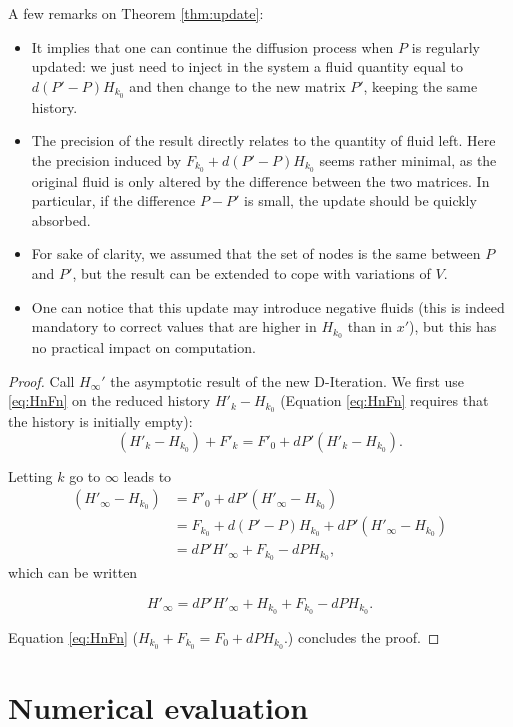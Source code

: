 \documentclass{llncs}
\begin{document}
A few remarks on Theorem \ref{thm:update}:
\begin{itemize}
\item It implies that one can continue the diffusion process when $P$ is regularly updated: we just need to inject in the system a fluid quantity equal to $d(P' - P) H_{k_0}$ and then change to the new matrix $P'$, keeping the same history. \item The precision of the result directly relates to the quantity of fluid left. Here the precision induced by $ F_{k_0}+d(P'-P)H_{k_0} $ seems rather minimal, as the original fluid is only altered by the difference between the two matrices. In particular, if the difference $ P-P' $ is small, the update should be quickly absorbed.
\item For sake of clarity, we assumed that the set of nodes is the same between $ P $ and $ P' $, but the result can be extended to cope with variations of $ V $.
\item One can notice that this update may introduce negative fluids (this is indeed mandatory to correct values that are higher in $ H_{k_0} $ than in $x'$), but this has no practical impact on computation.
\end{itemize}

\begin{proof}
Call $ H_{\infty}' $ the asymptotic result of the new D-Iteration. We first use \eqref{eq:HnFn} on the reduced history $ H'_k-H_{k_0} $ (Equation \eqref{eq:HnFn} requires that the history is initially empty):
$$(H'_k-H_{k_0}) + F'_k = F'_0 + d P' (H'_k-H_{k_0}).$$

Letting $ k $ go to $ \infty $ leads to 
$$
\begin{array}{rl}
(H'_{\infty}-H_{k_0}) &= F'_0 + d P' (H'_{\infty}-H_{k_0})\\
&= F_{k_0}+d(P'-P)H_{k_0}+ d P' (H'_{\infty}-H_{k_0})\\
&=  d P' H'_{\infty} +  F_{k_0} -d P H_{k_0},
\end{array}
$$
which can be written

$$H'_{\infty} =d P' H'_{\infty} +  H_{k_0} + F_{k_0} -d P H_{k_0}\text{.} $$

Equation \eqref{eq:HnFn} ($H_{k_0} + F_{k_0} = F_0 + d P H_{k_0}.
$) concludes the proof.

\end{proof}








\section{Numerical evaluation}
\end{document}
